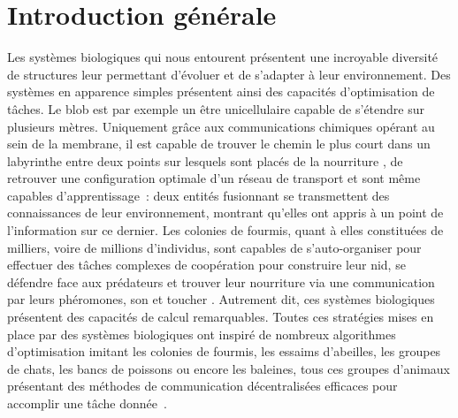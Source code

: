 \chapter*{Introduction générale}

Les systèmes biologiques qui nous entourent présentent une incroyable diversité de structures leur permettant d'évoluer et de s'adapter à leur environnement.
Des systèmes en apparence simples présentent ainsi des capacités d'optimisation de tâches. Le blob est par exemple un être unicellulaire capable de s'étendre sur plusieurs mètres. Uniquement grâce aux communications chimiques opérant au sein de la membrane, il est capable de trouver le chemin le plus court dans un labyrinthe entre deux points sur lesquels sont placés de la nourriture \cite{Nakagaki2000IntelligenceMB}, de retrouver une configuration optimale d'un réseau de transport et sont même capables d'apprentissage~: deux entités fusionnant se transmettent des connaissances de leur environnement, montrant qu'elles ont appris à un point de l'information sur ce dernier.
Les colonies de fourmis, quant à elles constituées de milliers, voire de millions d'individus, sont capables de s'auto-organiser pour effectuer des tâches complexes de coopération pour construire leur nid, se défendre face aux prédateurs et trouver leur nourriture via une communication par leurs phéromones, son et toucher \cite{jackson_communication_2006}.
Autrement dit, ces systèmes biologiques présentent des capacités de calcul remarquables. 
Toutes ces stratégies mises en place par des systèmes biologiques ont inspiré de nombreux algorithmes d'optimisation imitant les colonies de fourmis, les essaims d'abeilles, les groupes de chats, les bancs de poissons ou encore les baleines, tous ces groupes d'animaux présentant des méthodes de communication décentralisées efficaces pour accomplir une tâche donnée~\cite{Darwish2018BioinspiredCA}.

